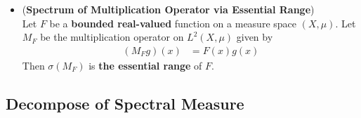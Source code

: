 \documentclass[11pt]{article}
\begin{document}
\begin{itemize}
\item \begin{proposition} (\textbf{Spectrum of Multiplication Operator via Essential Range}) \citep{reed1980methods}\\
Let $F$ be a \textbf{bounded real-valued} function on a measure  space $(X, \mu)$. Let $M_F$ be the multiplication operator on $L^2(X, \mu)$ given by 
\begin{align*}
(M_F g)(x) &= F(x) g(x)
\end{align*}
Then $\sigma(M_F)$ is \textbf{the essential range} of $F$. 
\end{proposition}
\end{itemize}

\subsection{Decompose of Spectral Measure}
\end{document}
